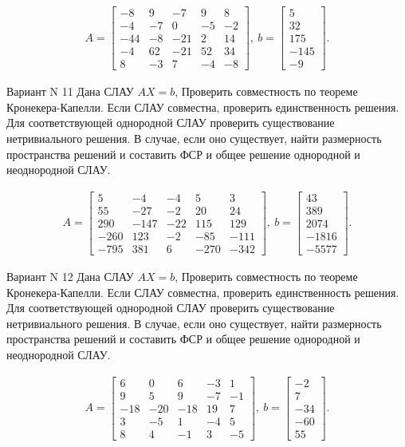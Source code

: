 \documentclass[11pt]{report}
\begin{document}
\begin{align*}
 A = \left[\begin{matrix}-8 & 9 & -7 & 9 & 8\\-4 & -7 & 0 & -5 & -2\\-44 & -8 & -21 & 2 & 14\\-4 & 62 & -21 & 52 & 34\\8 & -3 & 7 & -4 & -8\end{matrix}\right],
\ b = \left[\begin{matrix}5\\32\\175\\-145\\-9\end{matrix}\right]. 
 \end{align*}

Вариант N 11
Дана СЛАУ $AX = b$,
Проверить совместность по теореме Кронекера-Капелли. Если СЛАУ совместна, проверить единственность решения.
Для соответствующей однородной СЛАУ проверить существование нетривиального решения. В случае, если оно существует,
найти размерность пространства решений и составить ФСР и общее решение однородной  и неоднородной СЛАУ.


\begin{align*}
 A = \left[\begin{matrix}5 & -4 & -4 & 5 & 3\\55 & -27 & -2 & 20 & 24\\290 & -147 & -22 & 115 & 129\\-260 & 123 & -2 & -85 & -111\\-795 & 381 & 6 & -270 & -342\end{matrix}\right],
\ b = \left[\begin{matrix}43\\389\\2074\\-1816\\-5577\end{matrix}\right]. 
 \end{align*}

Вариант N 12
Дана СЛАУ $AX = b$,
Проверить совместность по теореме Кронекера-Капелли. Если СЛАУ совместна, проверить единственность решения.
Для соответствующей однородной СЛАУ проверить существование нетривиального решения. В случае, если оно существует,
найти размерность пространства решений и составить ФСР и общее решение однородной  и неоднородной СЛАУ.


\begin{align*}
 A = \left[\begin{matrix}6 & 0 & 6 & -3 & 1\\9 & 5 & 9 & -7 & -1\\-18 & -20 & -18 & 19 & 7\\3 & -5 & 1 & -4 & 5\\8 & 4 & -1 & 3 & -5\end{matrix}\right],
\ b = \left[\begin{matrix}-2\\7\\-34\\-60\\55\end{matrix}\right]. 
 \end{align*}
\end{document}
